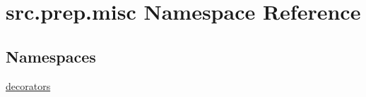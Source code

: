 \hypertarget{namespacesrc_1_1prep_1_1misc}{}\section{src.\+prep.\+misc Namespace Reference}
\label{namespacesrc_1_1prep_1_1misc}
\subsection*{Namespaces}
\begin{DoxyCompactItemize}
\item 
 \hyperlink{namespacesrc_1_1prep_1_1misc_1_1decorators}{decorators}
\end{DoxyCompactItemize}

